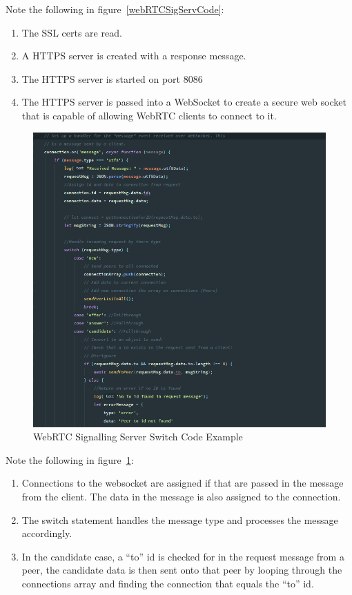 Note the following in figure~\ref{webRTCSigServCode}:
\begin{enumerate}
    \item The SSL certs are read.
    \item A HTTPS server is created with a response message.
    \item The HTTPS server is started on port 8086
    \item The HTTPS server is passed into a WebSocket to create a secure web socket that is capable of allowing WebRTC clients to connect to it.
\end{enumerate}

\begin{figure}[h!]
    \caption{WebRTC Signalling Server  Switch Code Example}
    \label{image:webRTCSigServSwitchCode}
    \centering
    \includegraphics[width=1.0\textwidth]{images/signalling_server_switch_code.png}
\end{figure}

Note the following in figure~\ref{image:webRTCSigServSwitchCode}:
\begin{enumerate}
    \item Connections to the websocket are assigned if that are passed in the message from the client. The data in the message is also assigned to the connection.
    \item The switch statement handles the message type and processes the message accordingly.
    \item In the candidate case, a “to” id is checked for in the request message from a peer, the candidate data is then sent onto that peer by looping through the connections array and finding the connection that equals the “to” id.
\end{enumerate}

